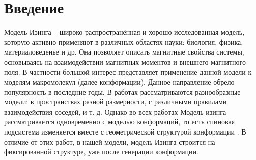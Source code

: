 \section{Введение}
Модель Изинга \cite{ising} -- широко распространённая и хорошо исследованная модель, которую активно применяют в различных областях науки: биология, физика, материаловеденье и др. Она позволяет описать магнитные свойства системы, основываясь на взаимодействии магнитных моментов и внешнего магнитного поля. В частности большой интерес представляет применение данной модели к моделям макромолекул \cite{SAW_polymer}(далее конформации). Данное направление обрело популярность в последние годы. В работах рассматриваются разнообразные модели: в пространствах разной размерности, с различными правилами взаимодействия соседей, и т. д. Однако во всех работах \cite{kamilapp} Модель изинга рассматривается одновременно с моделью конформаций, то есть спиновая подсистема изменяется вместе с геометрической структурой конформации . В отличие от этих работ, в нашей модели, модель Изинга строится на фиксированной структуре, уже после генерации конформации.

